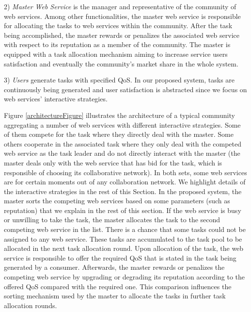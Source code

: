 \documentclass[runningheads,a4paper]{llncs}
\begin{document}
2) \textit{Master Web Service} is the manager and representative
of the community of web services. Among other functionalities, the
master web service is responsible for allocating the tasks to web
services within the community. After the task being accomplished,
the master rewards or penalizes the associated web service with
respect to its reputation as a member of the community. The master
is equipped with a task allocation mechanism aiming to increase
service users satisfaction and eventually the community's market
share in the whole system.

3) \textit{Users} generate tasks with specified QoS. In our
proposed system, tasks are continuously being generated and user
satisfaction is abstracted since we focus on web services'
interactive strategies.

Figure \ref{architectureFigure} illustrates the architecture of a
typical community aggregating a number of web services with
different interactive strategies. Some of them compete for the
task where they directly deal with the master. Some others
cooperate in the associated task where they only deal with the
competed web service as the task leader and do not directly
interact with the master (the master deals only with the web
service that has bid for the task, which is responsible of
choosing its collaborative network). In both sets, some web
services are for certain moments out of any collaboration network.
We highlight details of the interactive strategies in the rest of
this Section.
In the proposed system, the master sorts the competing web
services based on some parameters (such as reputation) that we
explain in the rest of this section. If the web service is busy or
unwilling to take the task, the master allocates the task to the
second competing web service in the list. There is a chance that
some tasks could not be assigned to any web service. These tasks
are accumulated to the task pool to be allocated in the next task
allocation round. Upon allocation of the task, the web service is
responsible to offer the required QoS that is stated in the task
being generated by a consumer. Afterwards,  the master rewards or
penalizes the competing web service by upgrading or degrading its
reputation according to the offered QoS compared with the required
one. This comparison influences the sorting mechanism used by the
master to allocate the tasks in further task allocation rounds.
\end{document}
